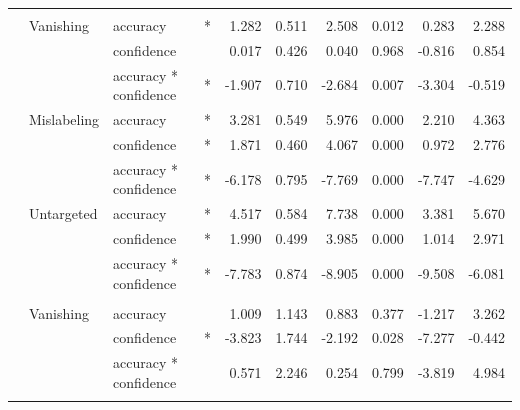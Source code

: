 \documentclass[
]{article}
\begin{document}
\begin{longtable}[t]{llllrrrrrr}
\cmidrule{1-10}\pagebreak[0]
\addlinespace[0.3em]
\multicolumn{10}{l}{\textbf{SSD}}\\
\hspace{1em} & Vanishing & accuracy & * & 1.282 & 0.511 & 2.508 & 0.012 & 0.283 & 2.288\\
\cmidrule{3-10}\nopagebreak
\hspace{1em} &  & confidence &  & 0.017 & 0.426 & 0.040 & 0.968 & -0.816 & 0.854\\
\cmidrule{3-10}\nopagebreak
\hspace{1em} &  & accuracy * confidence & * & -1.907 & 0.710 & -2.684 & 0.007 & -3.304 & -0.519\\
\cmidrule{2-10}\nopagebreak
\hspace{1em} & Mislabeling & accuracy & * & 3.281 & 0.549 & 5.976 & 0.000 & 2.210 & 4.363\\
\cmidrule{3-10}\nopagebreak
\hspace{1em} &  & confidence & * & 1.871 & 0.460 & 4.067 & 0.000 & 0.972 & 2.776\\
\cmidrule{3-10}\nopagebreak
\hspace{1em} &  & accuracy * confidence & * & -6.178 & 0.795 & -7.769 & 0.000 & -7.747 & -4.629\\
\cmidrule{2-10}\nopagebreak
\hspace{1em} & Untargeted & accuracy & * & 4.517 & 0.584 & 7.738 & 0.000 & 3.381 & 5.670\\
\cmidrule{3-10}\nopagebreak
\hspace{1em} &  & confidence & * & 1.990 & 0.499 & 3.985 & 0.000 & 1.014 & 2.971\\
\cmidrule{3-10}\nopagebreak
\hspace{1em} &  & accuracy * confidence & * & -7.783 & 0.874 & -8.905 & 0.000 & -9.508 & -6.081\\
\cmidrule{1-10}\pagebreak[0]
\addlinespace[0.3em]
\multicolumn{10}{l}{\textbf{RetinaNet}}\\
\hspace{1em} & Vanishing & accuracy &  & 1.009 & 1.143 & 0.883 & 0.377 & -1.217 & 3.262\\
\cmidrule{3-10}\nopagebreak
\hspace{1em} &  & confidence & * & -3.823 & 1.744 & -2.192 & 0.028 & -7.277 & -0.442\\
\cmidrule{3-10}\nopagebreak
\hspace{1em} &  & accuracy * confidence &  & 0.571 & 2.246 & 0.254 & 0.799 & -3.819 & 4.984\\
\cmidrule{2-10}\nopagebreak

\end{longtable}
\end{document}
